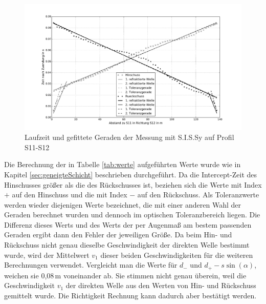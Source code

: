 \begin{figure}[!ht]
 \centering
 \includegraphics[width=\textwidth]{fig/plotsissy}
 \caption{Laufzeit und gefittete Geraden der Messung mit S.I.S.Sy auf Profil S11-S12}
 \label{fig:plotsissy}
\end{figure}

Die Berechnung der in Tabelle \ref{tab:werte} aufgeführten Werte wurde wie in Kapitel \ref{sec:geneigteSchicht} beschrieben durchgeführt. Da die Intercept-Zeit des Hinschusses größer als die des Rückschusses ist, beziehen sich die Werte mit Index $+$ auf den Hinschuss und die mit Index $-$ auf den Rückschuss. Als Toleranzwerte werden wieder diejenigen Werte bezeichnet, die mit einer anderen Wahl der Geraden berechnet wurden und dennoch im optischen Toleranzbereich liegen. Die Differenz dieses Werts und des Werts der per Augenmaß am bestem passenden Geraden ergibt dann den Fehler der jeweiligen Größe. Da beim Hin- und Rückschuss nicht genau dieselbe Geschwindigkeit der direkten Welle bestimmt wurde, wird der Mittelwert $v_1$ dieser beiden Geschwindigkeiten für die weiteren Berechnungen verwendet. Vergleicht man die Werte für $d_-$ und $d_+-s\sin(\alpha)$, weichen sie 0,08\,m voneinander ab. Sie stimmen nicht genau überein, weil die Geschwindigkeit $v_1$ der direkten Welle aus den Werten von Hin- und Rückschuss gemittelt wurde. Die Richtigkeit Rechnung kann dadurch aber bestätigt werden.

